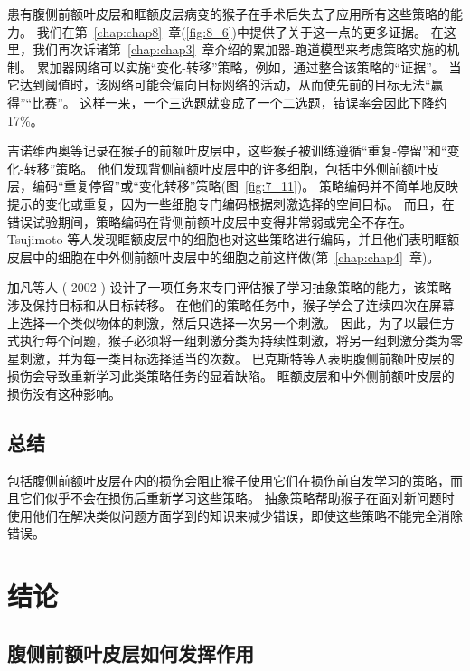 患有腹侧前额叶皮层和眶额皮层病变的猴子在手术后失去了应用所有这些策略的能力\cite{bussey2001role}。
我们在第~\ref{chap:chap8}~章(\ref{fig:8_6})中提供了关于这一点的更多证据。
在这里，我们再次诉诸第~\ref{chap:chap3}~章介绍的累加器-跑道模型来考虑策略实施的机制。 
累加器网络可以实施“变化-转移”策略，例如，通过整合该策略的“证据”。
当它达到阈值时，该网络可能会偏向目标网络的活动，从而使先前的目标无法“赢得”“比赛”。
这样一来，一个三选题就变成了一个二选题，错误率会因此下降约 17\%。
\par


吉诺维西奥等\cite{genovesio2005prefrontal}记录在猴子的前额叶皮层中，这些猴子被训练遵循“重复-停留”和“变化-转移”策略。
他们发现背侧前额叶皮层中的许多细胞，包括中外侧前额叶皮层，编码“重复停留”或“变化转移”策略(图~\ref{fig:7_11})。
策略编码并不简单地反映提示的变化或重复，因为一些细胞专门编码根据刺激选择的空间目标。
而且，在错误试验期间，策略编码在背侧前额叶皮层中变得非常弱或完全不存在\cite{genovesio2008encoding}。
Tsujimoto 等人\cite{tsujimoto2011comparison}发现眶额皮层中的细胞也对这些策略进行编码，并且他们表明眶额皮层中的细胞在中外侧前额叶皮层中的细胞之前这样做(第~\ref{chap:chap4}~章)。
\par 


加凡等人 ( 2002 ) 设计了一项任务来专门评估猴子学习抽象策略的能力，该策略涉及保持目标和从目标转移。
在他们的策略任务中，猴子学会了连续四次在屏幕上选择一个类似物体的刺激，然后只选择一次另一个刺激。
因此，为了以最佳方式执行每个问题，猴子必须将一组刺激分类为持续性刺激，将另一组刺激分类为零星刺激，并为每一类目标选择适当的次数。 
巴克斯特等人\cite{baxter2009ventrolateral}表明腹侧前额叶皮层的损伤会导致重新学习此类策略任务的显着缺陷。 
眶额皮层\cite{baxter2007orbital}和中外侧前额叶皮层\cite{baxter2008dorsolateral}的损伤没有这种影响。



\subsection{总结}
\par 
包括腹侧前额叶皮层在内的损伤会阻止猴子使用它们在损伤前自发学习的策略，而且它们似乎不会在损伤后重新学习这些策略。
抽象策略帮助猴子在面对新问题时使用他们在解决类似问题方面学到的知识来减少错误，即使这些策略不能完全消除错误。



\section{结论}

\subsection{腹侧前额叶皮层如何发挥作用}
\par

